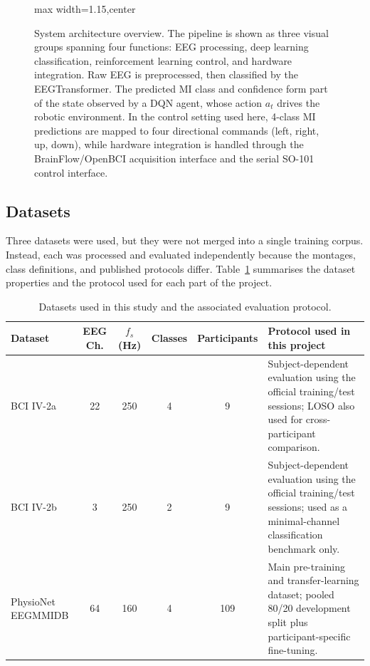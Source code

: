 \documentclass[12pt, a4paper]{article}
\begin{document}
\begin{figure}[htbp]
\begin{adjustbox}{max width=1.15\textwidth,center}
    \end{adjustbox}
    \fi
    \caption{System architecture overview. The pipeline is shown as three visual groups spanning four functions: EEG processing, deep learning classification, reinforcement learning control, and hardware integration. Raw EEG is preprocessed, then classified by the EEGTransformer. The predicted MI class and confidence form part of the state observed by a DQN agent, whose action $a_t$ drives the robotic environment. In the control setting used here, 4-class MI predictions are mapped to four directional commands (left, right, up, down), while hardware integration is handled through the BrainFlow/OpenBCI acquisition interface and the serial SO-101 control interface.}
    \label{fig:system_overview}
\end{figure}

\subsection{Datasets}

Three datasets were used, but they were not merged into a single training corpus. Instead, each was processed and evaluated independently because the montages, class definitions, and published protocols differ. Table~\ref{tab:datasets_v10} summarises the dataset properties and the protocol used for each part of the project.

\begin{table}[htbp]
\centering
\caption{Datasets used in this study and the associated evaluation protocol.}
\label{tab:datasets_v10}
\begin{tabular}{@{} >{\raggedright\arraybackslash}p{2.5cm} c c c c >{\raggedright\arraybackslash}p{4.3cm} @{}}
\toprule
\textbf{Dataset} & \textbf{EEG Ch.} & \textbf{$f_s$ (Hz)} & \textbf{Classes} & \textbf{Participants} & \textbf{Protocol used in this project} \\
\midrule
BCI IV-2a & 22 & 250 & 4 & 9 & Subject-dependent evaluation using the official training/test sessions; LOSO also used for cross-participant comparison. \\
BCI IV-2b & 3 & 250 & 2 & 9 & Subject-dependent evaluation using the official training/test sessions; used as a minimal-channel classification benchmark only. \\
PhysioNet EEGMMIDB & 64 & 160 & 4 & 109 & Main pre-training and transfer-learning dataset; pooled 80/20 development split plus participant-specific fine-tuning. \\
\bottomrule
\end{tabular}
\end{table}
\end{document}
